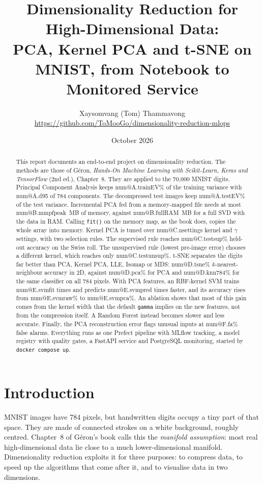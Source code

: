 \documentclass[11pt,a4paper]{article}
\title{Dimensionality Reduction for High-Dimensional Data:\\ PCA, Kernel PCA and t-SNE on MNIST, from Notebook to Monitored Service}
\author{Xaysomvang (Tom) Thammavong\\[2pt]
\small \url{https://github.com/ToMooGo/dimensionality-reduction-mlops}}
\date{October 2026}
\makeatletter
\newcommand{\R}[1]{\csname num@#1\endcsname}
\makeatother
\begin{document}
\maketitle

\begin{abstract}
\noindent
This report documents an end-to-end project on dimensionality reduction. The methods are those of Géron, \emph{Hands-On Machine Learning with Scikit-Learn, Keras and TensorFlow} (2nd ed.), Chapter~8. They are applied to the 70{,}000 MNIST digits.
Principal Component Analysis keeps \R{A.trainEV}\% of the training variance with \R{A.d95} of 784 components. The decompressed test images keep \R{A.testEV}\% of the test variance.
Incremental PCA fed from a memory-mapped file needs at most \R{B.mmpfpeak}~MB of memory, against \R{B.fullRAM}~MB for a full SVD with the data in RAM. Calling \texttt{fit()} on the memory map, as the book does, copies the whole array into memory.
Kernel PCA is tuned over \R{C.nsettings} kernel and $\gamma$ settings, with two selection rules. The supervised rule reaches \R{C.testsup}\% held-out accuracy on the Swiss roll. The unsupervised rule (lowest pre-image error) chooses a different kernel, which reaches only \R{C.testunsup}\%.
t-SNE separates the digits far better than PCA, Kernel PCA, LLE, Isomap or MDS: \R{D.tsne}\% $k$-nearest-neighbour accuracy in 2D, against \R{D.pca}\% for PCA and \R{D.knn784}\% for the same classifier on all 784 pixels.
With PCA features, an RBF-kernel SVM trains \R{E.svmfit} times and predicts \R{E.svmpred} times faster, and its accuracy rises from \R{E.svmraw}\% to \R{E.svmpca}\%. An ablation shows that most of this gain comes from the kernel width that the default \texttt{gamma} implies on the new features, not from the compression itself. A Random Forest instead becomes slower and less accurate.
Finally, the PCA reconstruction error flags unusual inputs at \R{F.fa}\% false alarms.
Everything runs as one Prefect pipeline with MLflow tracking, a model registry with quality gates, a FastAPI service and PostgreSQL monitoring, started by \texttt{docker compose up}.
\end{abstract}

\tableofcontents
\newpage

\section{Introduction}

MNIST images have 784 pixels, but handwritten digits occupy a tiny part of that space. They are made of connected strokes on a white background, roughly centred. Chapter~8 of Géron's book calls this the \emph{manifold assumption}: most real high-dimensional data lie close to a much lower-dimensional manifold. Dimensionality reduction exploits it for three purposes: to compress data, to speed up the algorithms that come after it, and to visualise data in two dimensions.
\end{document}
